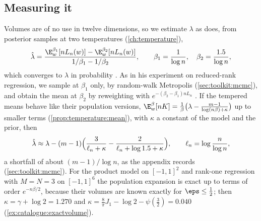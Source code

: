 \begin{refsection}
\section{Measuring it}\label{sec:catalogue:measuring}

Volumes are of no use in twelve dimensions, so we estimate $\lambda$ as \textcite{Watanabe2013} does, from posterior samples at two temperatures (\cref{ch:temperature}),
\[
\hat\lambda=\frac{\E^{\beta_1}_w[nL_n(w)]-\E^{\beta_2}_w[nL_n(w)]}{1/\beta_1-1/\beta_2},\qquad\beta_1=\frac1{\log n},\quad\beta_2=\frac{1.5}{\log n},
\]
which converges to $\lambda$ in probability \parencite[Corollary~3]{Watanabe2013}. As in his experiment on reduced-rank regression, we sample at $\beta_1$ only, by random-walk Metropolis (\cref{sec:toolkit:mcmc}), and obtain the mean at $\beta_2$ by reweighting with $e^{-(\beta_2-\beta_1)nL_n}$ \parencite[\S6.2 and eq.~(20)]{Watanabe2013}. If the tempered means behave like their population versions, $\E^\beta_w[nK]=\frac1\beta\bigl(\lambda-\frac{m-1}{\log(n\beta)+\kappa}\bigr)$ up to smaller terms (\cref{prop:temperature:mean}), with $\kappa$ a constant of the model and the prior, then
\begin{equation}\label{eq:catalogue:bias}
\hat\lambda\approx\lambda-(m-1)\Bigl(\frac3{\ell_n+\kappa}-\frac2{\ell_n+\log1.5+\kappa}\Bigr),\qquad\ell_n=\log\frac n{\log n},
\end{equation}
a shortfall of about $(m-1)/\log n$, as the appendix records (\cref{sec:toolkit:mcmc}). For the product model on $[-1,1]^2$ and rank-one regression with $M=N=3$ on $[-1,1]^6$ the population expansion is exact up to terms of order $e^{-n\beta/2}$, because their volumes are known exactly for $\eps\le\frac12$; then $\kappa=\gamma+\log2=1.270$ and $\kappa=\frac8\pi J_1-\log2-\psi(\frac32)=0.040$ (\cref{ex:catalogue:exactvolume}).


\end{refsection}
